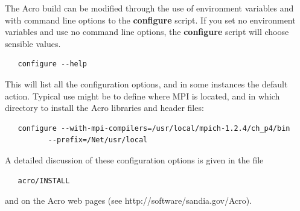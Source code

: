 The Acro build can be modified through the use of environment variables
and with command line options to the {\bf configure} script.  If you set no
environment variables and use no command line options, the {\bf configure}
script will choose sensible values.
\begin{verbatim}
   configure --help
\end{verbatim}
This will list all the configuration options, and in some instances the
default action.  Typical use might be to define where MPI is located,
and in which directory to install the Acro libraries and header files:
\begin{verbatim}
   configure --with-mpi-compilers=/usr/local/mpich-1.2.4/ch_p4/bin
          --prefix=/Net/usr/local
\end{verbatim}
A detailed discussion of these configuration options is given in the file
\begin{verbatim}
   acro/INSTALL
\end{verbatim}
and on the Acro web pages (see http://software/sandia.gov/Acro).
